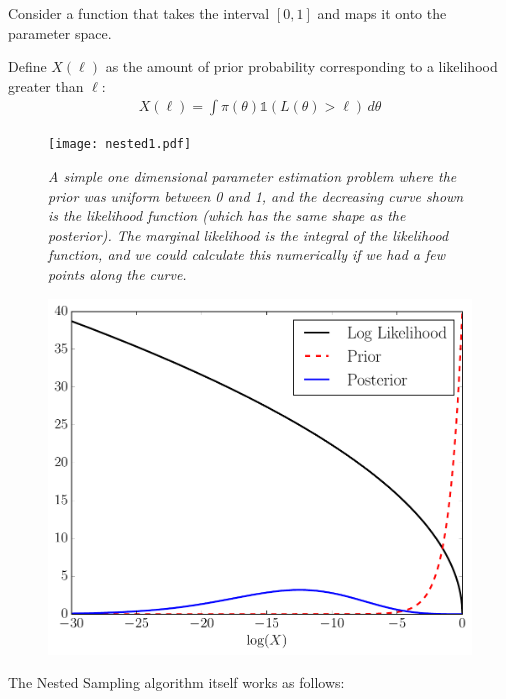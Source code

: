 Consider a function that takes the interval $[0, 1]$ and maps it onto the
parameter space. 

Define $X(\ell)$ as the amount of prior probability corresponding to a
likelihood greater than $\ell$:
\begin{eqnarray}
X(\ell) = \int \pi(\theta) \mathds{1}\left(L(\theta) > \ell\right)\, d\theta
\end{eqnarray}


\begin{figure}
\begin{center}
\texttt{[image: nested1.pdf]}
\caption{\it A simple one dimensional parameter estimation problem where the
prior was uniform between 0 and 1, and the decreasing curve shown is the likelihood
function (which has the same shape as the posterior). The marginal likelihood
is the integral of the likelihood function, and we could calculate this
numerically if we had a few points along the curve.
\label{fig:nested1}}
\end{center}
\end{figure}



\begin{figure}
\begin{center}
\includegraphics[scale=0.45]{nested2.pdf}
\caption{\it \label{fig:nested2}}
\end{center}
\end{figure}

The Nested Sampling algorithm itself works as follows:

